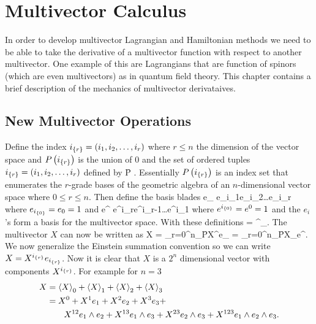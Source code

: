 \chapter{Multivector Calculus}
In order to develop multivector Lagrangian and Hamiltonian methods we need to be able to take the derivative of a multivector
function with respect to another multivector.  One example of this are Lagrangians that are function of spinors (which are 
even multivectors) as in quantum field theory.  This chapter contains a brief description of the mechanics of multivector derivataives.


\section{New Multivector Operations}
Define the index ${i}_{\left \{{r}\right \}} =\left ( {i_{1},i_{2},\dots,i_{r}} \right )$ where $r \le n$ the dimension of the vector space and ${P}\left ( {{i}_{\left \{{r}\right \}}} \right )$ is the union of $0$ and the
set of ordered tuples ${i}_{\left \{{r}\right \}} =\left ( {i_{1},i_{2},\dots,i_{r}} \right )$ defined by
\be
	\f{P}{} \equiv {}.
\ee
Essentially ${P}\left ( {{i}_{\left \{{r}\right \}}} \right )$ is an index set that enumerates the $r$-grade bases of the geometric algebra of an $n$-dimensional vector space
where $0\le r \le n$.  Then define the basis blades
\be
	e_{} \equiv e_{i_{1}}\W e_{i_{2}}\W\dots\W e_{i_{r}}
\ee 
where $e_{{i}_{\left \{{0}\right \}}} = e_{0} = 1$ and
\be
	e^{} \equiv e^{i_{r}}\W e^{i_{r-1}}\W\dots\W e^{i_{1}}
\ee 
where $e^{{i}_{\left \{{0}\right \}}} = e^{0} = 1$ and the $e_{i}$'s form a basis for the multivector space. With these definitions
\be
	\cdot {} = \delta^{}_{}.
\ee
The multivector $X$ can now be written as
\be
	X = \sum_{r=0}^{n}\hspace{4pt}\sum_{\in\f{P}{}}\hspace{-6pt}X^{}e_{} =
	    \sum_{r=0}^{n}\hspace{4pt}\sum_{\in\f{P}{}}\hspace{-6pt}X_{}e^{}.
\ee
We now generalize the Einstein summation convention so we can write $X = X^{{i}_{\left \{{r}\right \}}}e_{{i}_{\left \{{r}\right \}}}$.  Now it is clear that $X$ is a $2^{n}$
dimensional vector with components $X^{{i}_{\left \{{r}\right \}}}$. For example for $n=3$
\begin{align}
	X &= \left \langle {X} \right \rangle_{0}+\left \langle {X} \right \rangle_{1}+\left \langle {X} \right \rangle_{2}+\left \langle {X} \right \rangle_{3} \\
	  &= X^{0}+X^{1}e_{1}+X^{2}e_{2}+X^{3}e_{3}+ \nonumber \\
	  &\hspace{20pt}X^{12}e_{1}\wedge e_{2}+X^{13}e_{1}\wedge e_{3}+X^{23}e_{2}\wedge e_{3}+X^{123}e_{1}\wedge e_{2}\wedge e_{3}.
\end{align}

